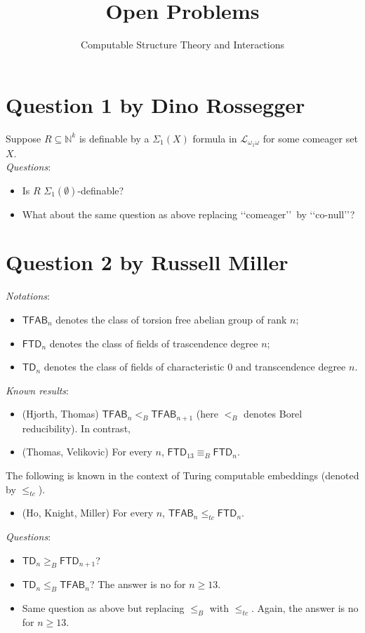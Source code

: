 \documentclass{article}
\title{Open Problems}
\author{Computable Structure Theory and Interactions}
\date{}
\begin{document}
\maketitle




\section*{Question 1 {\small{by Dino Rossegger}}}
Suppose $R \subseteq \mathbb{N}^k$ is definable by a $\Sigma_1(X)$ formula in $\mathcal{L}_{\omega_1\omega}$ for some comeager set $X$.\\
\textit{Questions}:
\begin{itemize}
    \item Is $R$ $\Sigma_1(\emptyset)$-definable?
    \item What about the same question as above replacing \lq\lq comeager\rq\rq\ by \lq\lq co-null\rq\rq?
\end{itemize}


\section*{Question 2 {\small{by Russell Miller}}}
\textit{Notations}:
\begin{itemize}
    \item $\mathsf{TFAB}_n$ denotes the class of torsion free abelian group of rank $n$;
    \item $\mathsf{FTD}_n$ denotes the class of fields of trascendence degree $n$;
    \item $\mathsf{TD}_n$  denotes the class of fields of characteristic $0$ and transcendence degree $n$.
\end{itemize}
\textit{Known results}:
\begin{itemize}
    \item (Hjorth, Thomas)  $\mathsf{TFAB}_n<_B \mathsf{TFAB}_{n+1}$ (here $<_B$ denotes Borel reducibility). In contrast, 
    \item (Thomas, Velikovic)   For every $n$, $\mathsf{FTD}_{13} \equiv_B \mathsf{FTD}_n$.
\end{itemize}
The following is known in the context of Turing computable embeddings (denoted by $\leq_{tc}$).
\begin{itemize}
    \item (Ho, Knight, Miller)    For every $n$, $\mathsf{TFAB}_n \leq_{tc} \mathsf{FTD}_n$.
\end{itemize}
\textit{Questions}:
\begin{itemize}
    \item $\mathsf{TD}_n \geq_B \mathsf{FTD}_{n+1}$?
    \item  $\mathsf{TD}_n \leq_B \mathsf{TFAB}_{n}$? The answer is no for $n \geq 13$.
    \item Same question as above but replacing $\leq_B$ with $\leq_{tc}$. Again, the answer is no for $n\geq13$.
\end{itemize}
\end{document}
